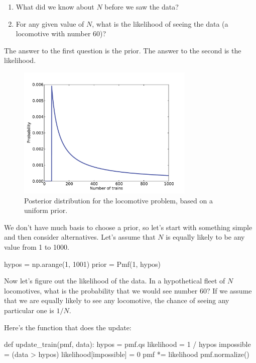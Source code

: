 \documentclass[12pt]{book}
\theoremstyle{exercise}
\begin{document}
\begin{enumerate}

\item What did we know about $N$ before we saw the data?

\item For any given value of $N$, what is the likelihood of
seeing the data (a locomotive with number 60)?

\end{enumerate}

The answer to the first question is the prior.  The answer to the
second is the likelihood.

\begin{figure}
\centerline{\includegraphics[height=2.5in]{figs/train1.pdf}}
\caption{Posterior distribution for the locomotive problem, based
on a uniform prior.}
\label{fig.train1}
\end{figure}

We don't have much basis to choose a prior, so let's start with
something simple and then consider alternatives.  Let's assume that
$N$ is equally likely to be any value from 1 to 1000.

\begin{code}
hypos = np.arange(1, 1001)
prior = Pmf(1, hypos)
\end{code}

Now let's figure out the likelihood of the data.
In a hypothetical fleet of $N$ locomotives, what is the probability that we would see number 60?
If we assume that we are equally likely to see any
locomotive, the chance of seeing any particular one is
$1/N$.

Here's the function that does the update:

\begin{code}
def update_train(pmf, data):
    hypos = pmf.qs
    likelihood = 1 / hypos
    impossible = (data > hypos)
    likelihood[impossible] = 0
    pmf *= likelihood
    pmf.normalize()
\end{code}
\end{document}
